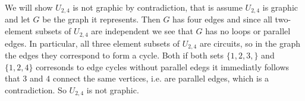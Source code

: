 We will show $U_{2,4}$ is not graphic by contradiction, that is assume $U_{2,4}$ is graphic and let $G$ be the graph it represents. Then $G$ has four edges and since all two-element subsets of $U_{2,4}$ are independent we see that $G$ has no loops or parallel edges. In particular, all three element subsets of $U_{2,4}$ are circuits, so in the graph the edges they correspond to form a cycle. Both if both sets $\{1,2,3,\}$ and $\{1,2,4\}$ corresonds to edge cycles without parallel edegs it immediatly follows that $3$ and $4$ connect the same vertices, i.e. are parallel edges, which is a contradiction. So $U_{2,4}$ is not graphic.

